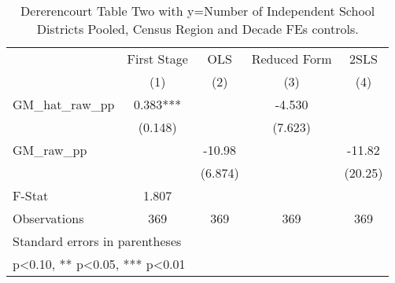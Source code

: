 \begin{table}[htbp]\centering
\def\sym#1{\ifmmode^{#1}\else\(^{#1}\)\fi}
\caption{Dererencourt Table Two with y=Number of Independent School Districts  Pooled, Census Region and Decade FEs controls.}
\begin{tabular}{l*{4}{c}}
\toprule
                    & First Stage   &         OLS   &Reduced Form   &        2SLS   \\
                    &\multicolumn{1}{c}{(1)}   &\multicolumn{1}{c}{(2)}   &\multicolumn{1}{c}{(3)}   &\multicolumn{1}{c}{(4)}   \\
\midrule
GM\_hat\_raw\_pp       &       0.383***&               &      -4.530   &               \\
                    &     (0.148)   &               &     (7.623)   &               \\
\addlinespace
GM\_raw\_pp           &               &      -10.98   &               &      -11.82   \\
                    &               &     (6.874)   &               &     (20.25)   \\
\midrule
F-Stat              &       1.807   &               &               &               \\
Observations        &         369   &         369   &         369   &         369   \\
\bottomrule
\multicolumn{5}{l}{\footnotesize Standard errors in parentheses}\\
\multicolumn{5}{l}{\footnotesize * p<0.10, ** p<0.05, *** p<0.01}\\
\end{tabular}
\end{table}
